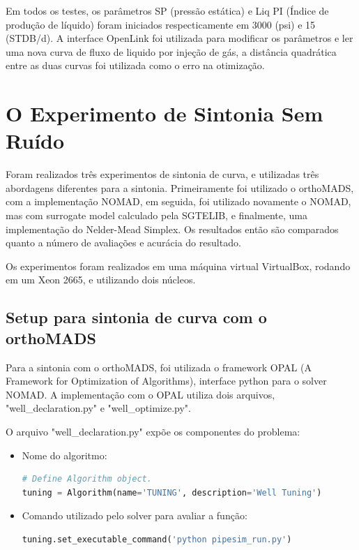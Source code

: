Em todos os testes, os parâmetros SP (pressão estática) e Liq PI (Índice de produção de líquido) foram iniciados respecticamente em 3000 (psi) e 15 (STDB/d). A interface OpenLink foi utilizada para modificar os parâmetros e ler uma nova curva de fluxo de liquido por injeção de gás, a distância quadrática entre as duas curvas foi utilizada como o erro na otimização.

\chapter{O Experimento de Sintonia Sem Ruído}

Foram realizados três experimentos de sintonia de curva, e utilizadas três abordagens diferentes para a sintonia. Primeiramente foi utilizado o orthoMADS, com a implementação NOMAD, em seguida, foi utilizado novamente o NOMAD, mas com surrogate model calculado pela SGTELIB, e finalmente, uma implementação do Nelder-Mead Simplex. Os resultados então são comparados quanto a número de avaliações e acurácia do resultado.

Os experimentos foram realizados em uma máquina virtual VirtualBox, rodando em um Xeon 2665, e utilizando dois núcleos.

\section{Setup para sintonia de curva com o orthoMADS}
Para a sintonia com o orthoMADS, foi utilizada o framework OPAL (A Framework for Optimization of Algorithms), interface python para o solver NOMAD.
A implementação com o OPAL utiliza dois arquivos, "well\_declaration.py" e "well\_optimize.py".

O arquivo "well\_declaration.py" expõe os componentes do problema:

\begin{itemize}
\item Nome do algoritmo:
\begin{lstlisting}[language=Python]
# Define Algorithm object.
tuning = Algorithm(name='TUNING', description='Well Tuning')
\end{lstlisting}
\end{itemize}

\begin{itemize}
\item Comando utilizado pelo solver para avaliar a função:
\begin{lstlisting}[language=Python]
tuning.set_executable_command('python pipesim_run.py')
\end{lstlisting}
\end{itemize}


